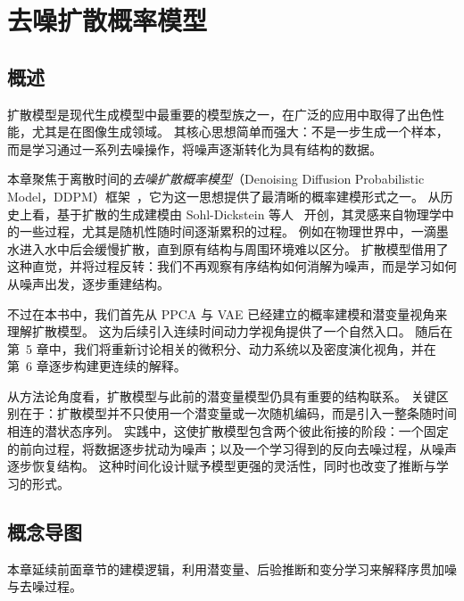 \chapter{去噪扩散概率模型}
\section*{概述}

扩散模型是现代生成模型中最重要的模型族之一，在广泛的应用中取得了出色性能，尤其是在图像生成领域。
其核心思想简单而强大：不是一步生成一个样本，而是学习通过一系列去噪操作，将噪声逐渐转化为具有结构的数据。

本章聚焦于离散时间的\emph{去噪扩散概率模型}（Denoising Diffusion Probabilistic Model，DDPM）框架~\cite{ho2020denoising}，它为这一思想提供了最清晰的概率建模形式之一。
从历史上看，基于扩散的生成建模由 Sohl-Dickstein 等人~\cite{sohl2015deep} 开创，其灵感来自物理学中的一些过程，尤其是随机性随时间逐渐累积的过程。
例如在物理世界中，一滴墨水进入水中后会缓慢扩散，直到原有结构与周围环境难以区分。
扩散模型借用了这种直觉，并将过程反转：我们不再观察有序结构如何消解为噪声，而是学习如何从噪声出发，逐步重建结构。

不过在本书中，我们首先从 PPCA 与 VAE 已经建立的概率建模和潜变量视角来理解扩散模型。
这为后续引入连续时间动力学视角提供了一个自然入口。
随后在第~5 章中，我们将重新讨论相关的微积分、动力系统以及密度演化视角，并在第~6 章逐步构建更连续的解释。

从方法论角度看，扩散模型与此前的潜变量模型仍具有重要的结构联系。
关键区别在于：扩散模型并不只使用一个潜变量或一次随机编码，而是引入一整条随时间相连的潜状态序列。
实践中，这使扩散模型包含两个彼此衔接的阶段：一个固定的前向过程，将数据逐步扰动为噪声；以及一个学习得到的反向去噪过程，从噪声逐步恢复结构。
这种时间化设计赋予模型更强的灵活性，同时也改变了推断与学习的形式。

\section*{概念导图}

本章延续前面章节的建模逻辑，利用潜变量、后验推断和变分学习来解释序贯加噪与去噪过程。


